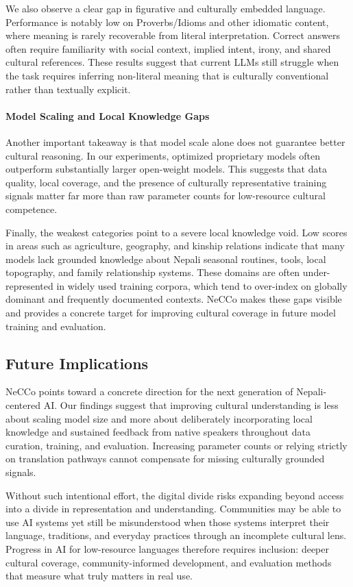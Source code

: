 \documentclass[10pt, a4paper]{article}
\begin{document}
We also observe a clear gap in figurative and culturally embedded language. Performance is notably low on Proverbs/Idioms and other idiomatic content, where meaning is rarely recoverable from literal interpretation. Correct answers often require familiarity with social context, implied intent, irony, and shared cultural references. These results suggest that current LLMs still struggle when the task requires inferring non-literal meaning that is culturally conventional rather than textually explicit.

\paragraph{Model Scaling and Local Knowledge Gaps}
Another important takeaway is that model scale alone does not guarantee better cultural reasoning. In our experiments, optimized proprietary models often outperform substantially larger open-weight models. This suggests that data quality, local coverage, and the presence of culturally representative training signals matter far more than raw parameter counts for low-resource cultural competence.

Finally, the weakest categories point to a severe local knowledge void. Low scores in areas such as agriculture, geography, and kinship relations indicate that many models lack grounded knowledge about Nepali seasonal routines, tools, local topography, and family relationship systems. These domains are often under-represented in widely used training corpora, which tend to over-index on globally dominant and frequently documented contexts. NeCCo makes these gaps visible and provides a concrete target for improving cultural coverage in future model training and evaluation.

\subsection{Future Implications}
NeCCo points toward a concrete direction for the next generation of Nepali-centered AI. Our findings suggest that improving cultural understanding is less about scaling model size and more about deliberately incorporating local knowledge and sustained feedback from native speakers throughout data curation, training, and evaluation. Increasing parameter counts or relying strictly on translation pathways cannot compensate for missing culturally grounded signals.

Without such intentional effort, the digital divide risks expanding beyond access into a divide in representation and understanding. Communities may be able to use AI systems yet still be misunderstood when those systems interpret their language, traditions, and everyday practices through an incomplete cultural lens. Progress in AI for low-resource languages therefore requires inclusion: deeper cultural coverage, community-informed development, and evaluation methods that measure what truly matters in real use.
\end{document}
